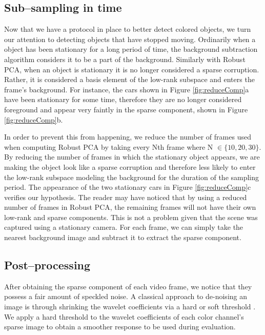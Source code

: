 \documentclass{article}
\begin{document}
\subsection{Sub--sampling in time}

Now that we have a protocol in place to better detect colored objects, we turn our attention to detecting objects that have stopped moving. Ordinarily when a object has been stationary for a long period of time, the background subtraction algorithm considers it  to be a part of the background. Similarly with  Robust PCA, when an object is stationary it is no longer considered a sparse corruption. Rather, it is considered a basis element of the low-rank subspace and enters the frame's background. For instance, the cars shown in Figure \ref{fig:reduceComp}a have been stationary for some time, therefore they are no longer considered foreground and appear very faintly in the sparse component, shown in Figure \ref{fig:reduceComp}b.
 
In order to prevent this from happening, we reduce the number of frames used when computing Robust PCA by taking every Nth frame where N $\in \{ 10, 20, 30\}$. By reducing the number of frames in which the stationary object appears, we are making the object look like a sparse corruption and therefore less likely to enter the low-rank subspace modeling the background for the duration of the sampling period. The appearance of the two stationary cars in Figure \ref{fig:reduceComp}c verifies our hypothesis. The reader may have noticed that by using a reduced number of frames in Robust PCA, the remaining frames will not have their own low-rank and sparse components. This is not a problem given that the scene was captured using a stationary camera. For each frame, we can simply take the nearest background image and subtract it to extract the sparse component.

\subsection{Post--processing}

After obtaining the sparse component of each video frame, we notice that they possess a fair amount of speckled noise. A classical approach to de-noising an image is through shrinking the wavelet coefficients via a hard or soft threshold \cite{Donoho95}. We apply a hard threshold to the wavelet coefficients of each color channel's sparse image to obtain a smoother response to be used during evaluation.
\end{document}
